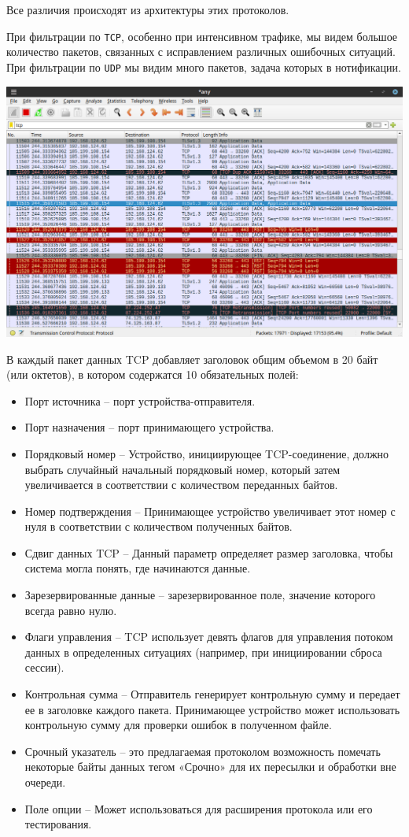 Все различия происходят из архитектуры этих протоколов.

При фильтрации по \texttt{TCP}, особенно при интенсивном трафике, мы видем большое количество пакетов, связанных с исправлением различных ошибочных ситуаций. При фильтрации по \texttt{UDP} мы видим много пакетов, задача которых в нотификации.

\begin{center}
    \includegraphics[scale=0.5]{res/5.wireshark-tcp.png}
\end{center}

В каждый пакет данных TCP добавляет заголовок общим объемом в 20 байт (или октетов), в котором содержатся 10 обязательных полей:
\begin{itemize}
    \item Порт источника -- порт устройства-отправителя.
    \item Порт назначения -- порт принимающего устройства.
    \item Порядковый номер -- Устройство, инициирующее TCP-соединение, должно выбрать случайный начальный порядковый номер, который затем увеличивается в соответствии с количеством переданных байтов.
    \item Номер подтверждения -- Принимающее устройство увеличивает этот номер с нуля в соответствии с количеством полученных байтов.
    \item Сдвиг данных TCP -- Данный параметр определяет размер заголовка, чтобы система могла понять, где начинаются данные.
    \item Зарезервированные данные -- зарезервированное поле, значение которого всегда равно нулю. 
    \item Флаги управления -- TCP использует девять флагов для управления потоком данных в определенных ситуациях (например, при инициировании сброса сессии).
    \item Контрольная сумма -- Отправитель генерирует контрольную сумму и передает ее в заголовке каждого пакета. Принимающее устройство может использовать контрольную сумму для проверки ошибок в полученном файле.
    \item Срочный указатель -- это предлагаемая протоколом возможность помечать некоторые байты данных тегом «Срочно» для их пересылки и обработки вне очереди.
    \item Поле опции -- Может использоваться для расширения протокола или его тестирования.
\end{itemize}

